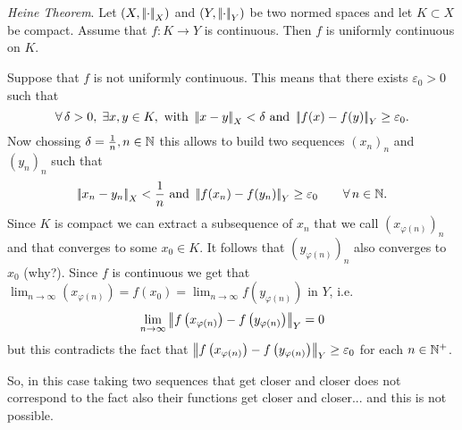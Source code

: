 \documentclass{article}
\begin{document}
\begin{theorem}
	\emph{Heine Theorem}. Let $(X,\left|\negthinspace\left|\cdot\right|\negthinspace\right|_X)$ and $(Y,\left|\negthinspace\left|\cdot\right|\negthinspace\right|_Y)$ be two normed spaces and let $K\subset X$ be compact. Assume that $f:K\to Y$ is continuous. Then $f$ is uniformly continuous on $K$.
\end{theorem}
\begin{fancyproof}
	Suppose that $f$ is not uniformly continuous. This means that there exists $\varepsilon_0>0$  such that
	\begin{equation*}
		\forall\,\delta>0,\;\exists x,y\in K,\text{ with }\left|\negthinspace\left|x-y\right|\negthinspace\right|_{X}<\delta\text{ and }\left|\negthinspace\left|f(x)-f(y)\right|\negthinspace\right|_{Y}\geq\varepsilon_0	.
		\end{equation*}
		Now chossing $\delta=\frac{1}{n},n\in\mathbb{N}$ this allows to build two sequences ${(x_{n})}_{n}$ and ${(y_{n})}_{n}$ such that
		\begin{equation*}
			\left|\negthinspace\left|x_{n}-y_n\right|\negthinspace\right|_{X}<\frac{1}{n}\text{ and }\left|\negthinspace\left|f(x_{n})-f(y_{n})\right|\negthinspace\right|_{Y}\geq\varepsilon_0\qquad\forall\, n\in\mathbb{N}.
		\end{equation*}
		Since $K$ is compact we can extract a subsequence of $x_n$ that we call ${\left(x_{\varphi(n)}\right)}_{n}$ and that converges to some $x_0\in K$. It follows that ${\left(y_{\varphi(n)}\right)}_{n}$ also converges to $x_0$ (why?). Since $f$ is continuous we get that $\lim_{n\to\infty}{\left(x_{\varphi(n)}\right)}=f(x_0)=\lim_{n\to\infty}f\left(y_{\varphi(n)}\right)$ in $Y$, i.e.
		\begin{equation*}
			\lim_{n \to \infty}\left|\negthinspace\left|f\left(x_{\varphi(n)}\right)-f\left(y_{\varphi(n)}\right)\right|\negthinspace\right|_{Y}=0
		\end{equation*}
		but this contradicts the fact that $\left|\negthinspace\left|f\left(x_{\varphi(n)}\right)-f\left(y_{\varphi(n)}\right)\right|\negthinspace\right|_{Y}\geq\varepsilon_0$ for each $n\in\mathbb{N}^{+}$. 
\end{fancyproof}
So, in this case taking two sequences that get closer and closer does not correspond to the fact also their functions get closer and closer... and this is not possible.
\end{document}
